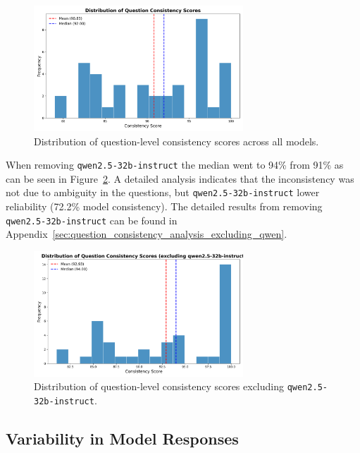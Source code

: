 \begin{figure}[htbp]
    \centering
    \includegraphics[width=0.7\textwidth]{figures/histogram_question_consistency.png}
    \caption{Distribution of question-level consistency scores across all models.}
    \label{fig:question_consistency_histogram}
\end{figure}

When removing \texttt{qwen2.5-\allowbreak 32b-\allowbreak instruct} the median went to 94\% from 91\% as can be seen in Figure~\ref{fig:question_consistency_histogram_exclude_qwen}. A detailed analysis indicates that the inconsistency was not due to ambiguity in the questions, but \texttt{qwen2.5-\allowbreak 32b-\allowbreak instruct} lower reliability (72.2\% model consistency). The detailed results from removing \texttt{qwen2.5-\allowbreak 32b-\allowbreak instruct} can be found in Appendix~\ref{sec:question_consistency_analysis_excluding_qwen}.

\begin{figure}[htbp]
    \centering
    \includegraphics[width=0.7\textwidth]{figures/histogram_question_consistency_excluding_qwen2.5-32b-instruct.png}
    \caption{Distribution of question-level consistency scores excluding \texttt{qwen2.5-32b-instruct}.}
    \label{fig:question_consistency_histogram_exclude_qwen}
\end{figure}

\subsection{Variability in Model Responses}

